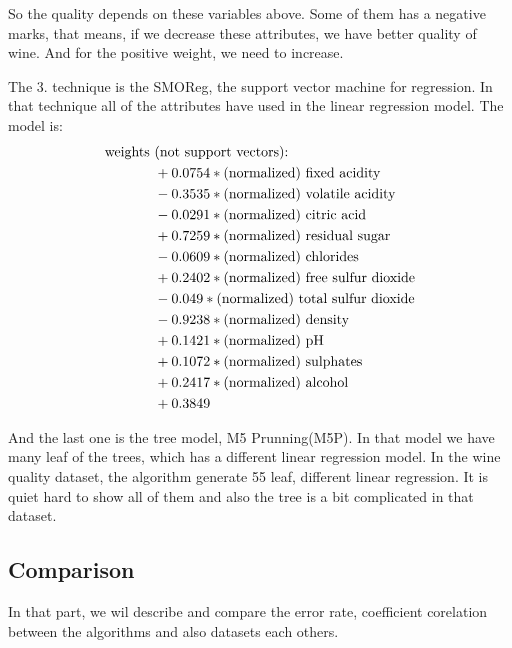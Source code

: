 \documentclass[a4paper]{article}
\begin{document}
So the quality depends on these variables above. Some of them has a negative marks, that means, if we decrease these attributes, we have better quality of wine. And for the positive weight, we need to increase.

The 3. technique is the SMOReg, the support vector machine for regression. In that technique all of the attributes have used in the linear regression model. The model is:
\begin{align*}
\textnormal{weights }& \textnormal{(not support vectors):} \\
& +       0.0754 * \textnormal{(normalized) fixed acidity}\\
& -       0.3535 * \textnormal{(normalized) volatile acidity}\\
& -       0.0291 * \textnormal{(normalized) citric acid}\\
& +       0.7259 * \textnormal{(normalized) residual sugar}\\
& -       0.0609 * \textnormal{(normalized) chlorides}\\
& +       0.2402 * \textnormal{(normalized) free sulfur dioxide}\\
& -       0.049  * \textnormal{(normalized) total sulfur dioxide}\\
& -       0.9238 * \textnormal{(normalized) density}\\
& +       0.1421 * \textnormal{(normalized) pH}\\
& +       0.1072 * \textnormal{(normalized) sulphates}\\
& +       0.2417 * \textnormal{(normalized) alcohol}\\
& +       0.3849\\
 \end{align*}

And the last one is the tree model, M5 Prunning(M5P). In that model we have many leaf of the trees, which has a different linear regression model. In the wine quality dataset, the algorithm generate 55 leaf, different linear regression. It is quiet hard to show all of them and also the tree is a bit complicated in that dataset.


\subsection{Comparison}

In that part, we wil describe and compare the error rate, coefficient corelation between the algorithms and also datasets each others. 
\end{document}
